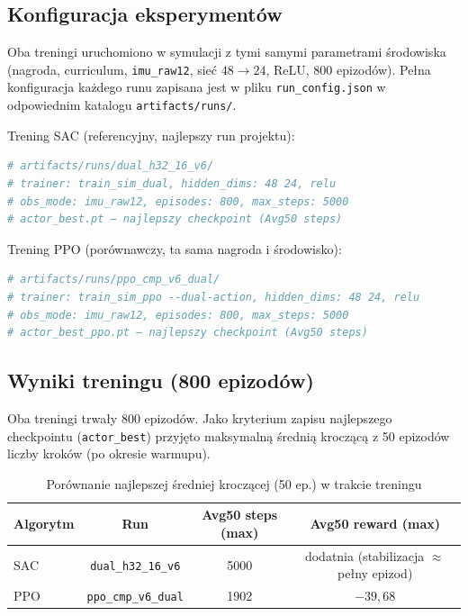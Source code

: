 \documentclass[12pt,twoside]{article}
\begin{document}
\subsection{Konfiguracja eksperymentów}

Oba treningi uruchomiono w symulacji z tymi samymi parametrami środowiska (nagroda, curriculum, \texttt{imu\_raw12}, sieć $48 \rightarrow 24$, ReLU, 800 epizodów). Pełna konfiguracja każdego runu zapisana jest w pliku \texttt{run\_config.json} w odpowiednim katalogu \texttt{artifacts/runs/}.

Trening SAC (referencyjny, najlepszy run projektu):
\begin{lstlisting}[language=bash, caption=Run SAC dual (skrót — pełna konfiguracja w run_config.json)]
# artifacts/runs/dual_h32_16_v6/
# trainer: train_sim_dual, hidden_dims: 48 24, relu
# obs_mode: imu_raw12, episodes: 800, max_steps: 5000
# actor_best.pt — najlepszy checkpoint (Avg50 steps)
\end{lstlisting}

Trening PPO (porównawczy, ta sama nagroda i środowisko):
\begin{lstlisting}[language=bash, caption=Run PPO dual (skrót — pełna konfiguracja w run_config.json)]
# artifacts/runs/ppo_cmp_v6_dual/
# trainer: train_sim_ppo --dual-action, hidden_dims: 48 24, relu
# obs_mode: imu_raw12, episodes: 800, max_steps: 5000
# actor_best_ppo.pt — najlepszy checkpoint (Avg50 steps)
\end{lstlisting}

\subsection{Wyniki treningu (800 epizodów)}

Oba treningi trwały 800 epizodów. Jako kryterium zapisu najlepszego checkpointu (\texttt{actor\_best}) przyjęto maksymalną średnią kroczącą z 50 epizodów liczby kroków (po okresie warmupu).

\begin{table}[H]
\centering
\renewcommand{\arraystretch}{1.2}
\begin{tabular}{|l|c|c|c|}
\hline
\textbf{Algorytm} & \textbf{Run} & \textbf{Avg50 steps (max)} & \textbf{Avg50 reward (max)} \\
\hline
SAC & \texttt{dual\_h32\_16\_v6} & 5000 & dodatnia (stabilizacja $\approx$ pełny epizod) \\
PPO & \texttt{ppo\_cmp\_v6\_dual} & 1902 & $-39{,}68$ \\
\hline
\end{tabular}
\caption{Porównanie najlepszej średniej kroczącej (50 ep.) w trakcie treningu}
\label{tab:sac_ppo_train}
\end{table}
\end{document}
